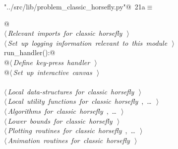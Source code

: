\documentclass[11.5pt]{report}
\begin{document}
\begin{flushleft} \small\label{scrap22}\raggedright\small
{} \verb@"../src/lib/problem_classic_horsefly.py"@\nobreak\ {\footnotesize {21a}}$\equiv$
\vspace{-1ex}
\begin{list}{}{} \item
\mbox{}\verb@    @\\
\mbox{}\verb@@\hbox{$\langle\,${\itshape Relevant imports for classic horsefly}\nobreak\ {\footnotesize {}}$\,\rangle$}\verb@@\\
\mbox{}\verb@@\hbox{$\langle\,${\itshape Set up logging information relevant to this module}\nobreak\ {\footnotesize {}}$\,\rangle$}\verb@@\\
\mbox{}\verb@def run_handler():@\\
\mbox{}\verb@    @\hbox{$\langle\,${\itshape Define key-press handler}\nobreak\ {\footnotesize {}}$\,\rangle$}\verb@@\\
\mbox{}\verb@    @\hbox{$\langle\,${\itshape Set up interactive canvas}\nobreak\ {\footnotesize {}}$\,\rangle$}\verb@@\\
\mbox{}\verb@@\\
\mbox{}\verb@@\hbox{$\langle\,${\itshape Local data-structures for classic horsefly}\nobreak\ {\footnotesize {}}$\,\rangle$}\verb@@\\
\mbox{}\verb@@\hbox{$\langle\,${\itshape Local utility functions for classic horsefly}\nobreak\ {\footnotesize {}, \ldots\ }$\,\rangle$}\verb@@\\
\mbox{}\verb@@\hbox{$\langle\,${\itshape Algorithms for classic horsefly}\nobreak\ {\footnotesize {}, \ldots\ }$\,\rangle$}\verb@@\\
\mbox{}\verb@@\hbox{$\langle\,${\itshape Lower bounds for classic horsefly}\nobreak\ {\footnotesize {}}$\,\rangle$}\verb@@\\
\mbox{}\verb@@\hbox{$\langle\,${\itshape Plotting routines for classic horsefly}\nobreak\ {\footnotesize {}, \ldots\ }$\,\rangle$}\verb@@\\
\mbox{}\verb@@\hbox{$\langle\,${\itshape Animation routines for classic horsefly}\nobreak\ {\footnotesize {}}$\,\rangle$}\verb@@\\
\mbox{}\verb@@{\NWsep}
\end{list}
\vspace{-1.5ex}
\footnotesize
\begin{list}{}{\setlength{\itemsep}{-\parsep}\setlength{\itemindent}{-\leftmargin}}

\item{}
\end{list}
\vspace{4ex}
\end{flushleft}
\end{document}
